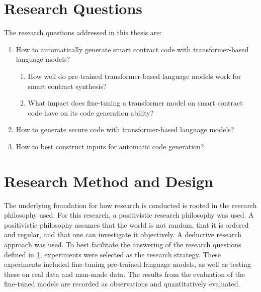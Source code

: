 \section{Research Questions}
\label{sec:research-questions}
The research questions addressed in this thesis are:

\begin{enumerate}[label=\textbf{RQ\arabic*.}, leftmargin=1.5cm]
    \item How to automatically generate smart contract code with transformer-based language models?
    \begin{enumerate}[label*=\textbf{\arabic*.}]
        \item How well do pre-trained transformer-based language models work for smart contract synthesis? 
        \item What impact does fine-tuning a transformer model on smart contract code have on its code generation ability?
    \end{enumerate}
    \item How to generate secure code with transformer-based language models?
    \item How to best construct inputs for automatic code generation?
\end{enumerate}

\section{Research Method and Design}
\label{sec:research-method-and-design}

The underlying foundation for how research is conducted is rooted in the research philosophy used. For this research, a positivistic research philosophy was used. A positivistic philosophy assumes that the world is not random, that it is ordered and regular, and that one can investigate it objectively.  A deductive research approach was used. To best facilitate the answering of the research questions defined in \cref{sec:research-questions}, experiments were selected as the research strategy. These experiments included fine-tuning pre-trained language models, as well as testing these on real data and man-made data. The results from the evaluation of the fine-tuned models are recorded as observations and quantitatively evaluated.




